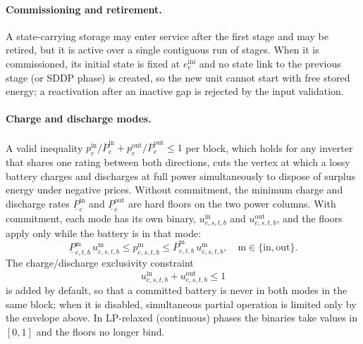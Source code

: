 \paragraph{Commissioning and retirement.}
A state-carrying storage may enter service after the first stage and
may be retired, but it is active over a single contiguous run of
stages.  When it is commissioned, its initial state is fixed at
$e^\text{ini}_e$ and no state link to the previous stage (or SDDP
phase) is created, so the new unit cannot start with free stored
energy; a reactivation after an inactive gap is rejected by the input
validation.

\paragraph{Charge and discharge modes.}
A valid inequality
$p^\text{in}_{e}/\overline{P}^\text{in}_{e}
+ p^\text{out}_{e}/\overline{P}^\text{out}_{e} \leq 1$ per block,
which holds for any inverter that shares one rating between both
directions, cuts the vertex at which a lossy battery charges and
discharges at full power simultaneously to dispose of surplus energy
under negative prices.  Without commitment, the minimum charge and
discharge rates $\underline{P}^\text{in}_e$ and
$\underline{P}^\text{out}_e$ are hard floors on the two power columns.
With commitment, each mode has its own binary,
$u^\text{in}_{e,s,t,b}$ and $u^\text{out}_{e,s,t,b}$, and the floors
apply only while the battery is in that mode:
\begin{equation}
\label{eq:bat_modes}
\underline{P}^\text{m}_{e,t,b}\, u^\text{m}_{e,s,t,b}
  \leq p^\text{m}_{e,s,t,b}
  \leq \overline{P}^\text{m}_{e,t,b}\, u^\text{m}_{e,s,t,b},
  \quad \text{m} \in \{\text{in}, \text{out}\}.
\end{equation}
The charge/discharge exclusivity constraint
\begin{equation}
\label{eq:bat_exclusive}
u^\text{in}_{e,s,t,b} + u^\text{out}_{e,s,t,b} \leq 1
\end{equation}
is added by default, so that a committed battery is never in both modes
in the same block; when it is disabled, simultaneous partial operation
is limited only by the envelope above.  In LP-relaxed (continuous)
phases the binaries take values in $[0,1]$ and the floors no longer
bind.

